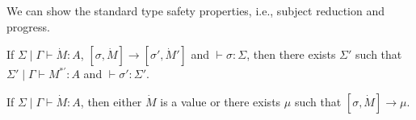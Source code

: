 We can show the standard type safety properties, i.e., subject reduction and progress.
\begin{thm}
  If $\Sigma\mid\Gamma \vdash \dot{M} : A$, $[\sigma,\dot{M}] \to [\sigma',\dot{M}']$ and $\vdash \sigma : \Sigma$,
  then there exists $\Sigma'$ such that $\Sigma' \mid \Gamma \vdash M^{*'} : A$ and $\vdash \sigma' : \Sigma'$.
\end{thm}

\begin{thm}[Progress]
  If $\Sigma \mid \Gamma \vdash \dot{M} : A$,
  then either $\dot{M}$ is a value or there exists $\mu$ such that $[\sigma,\dot{M}] \to \mu$.

\end{thm}
